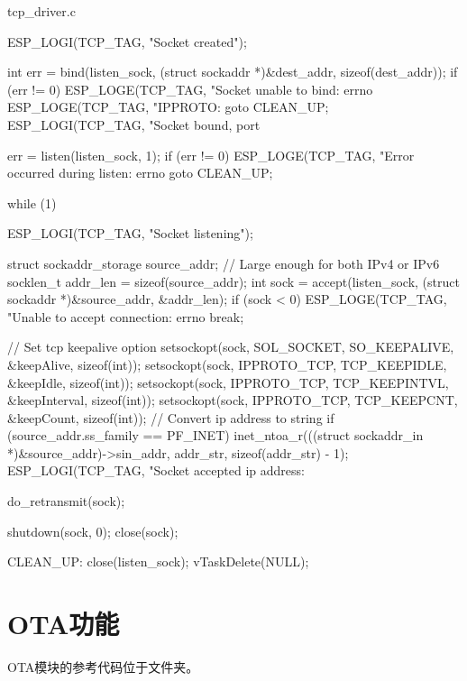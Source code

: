 \documentclass[lang=cn,newtx,10pt,scheme=chinese]{elegantbook}
\begin{document}
\begin{mycode}{tcp\_driver.c}
{    ESP_LOGI(TCP_TAG, "Socket created");

    int err = bind(listen_sock, (struct sockaddr *)&dest_addr, sizeof(dest_addr));
    if (err != 0)
    {
        ESP_LOGE(TCP_TAG, "Socket unable to bind: errno %
        ESP_LOGE(TCP_TAG, "IPPROTO: %
        goto CLEAN_UP;
    }
    ESP_LOGI(TCP_TAG, "Socket bound, port %

    err = listen(listen_sock, 1);
    if (err != 0)
    {
        ESP_LOGE(TCP_TAG, "Error occurred during listen: errno %
        goto CLEAN_UP;
    }

    while (1)
    {

        ESP_LOGI(TCP_TAG, "Socket listening");

        struct sockaddr_storage source_addr; // Large enough for both IPv4 or IPv6
        socklen_t addr_len = sizeof(source_addr);
        int sock = accept(listen_sock, (struct sockaddr *)&source_addr, &addr_len);
        if (sock < 0)
        {
            ESP_LOGE(TCP_TAG, "Unable to accept connection: errno %
            break;
        }

        // Set tcp keepalive option
        setsockopt(sock, SOL_SOCKET, SO_KEEPALIVE, &keepAlive, sizeof(int));
        setsockopt(sock, IPPROTO_TCP, TCP_KEEPIDLE, &keepIdle, sizeof(int));
        setsockopt(sock, IPPROTO_TCP, TCP_KEEPINTVL, &keepInterval, sizeof(int));
        setsockopt(sock, IPPROTO_TCP, TCP_KEEPCNT, &keepCount, sizeof(int));
        // Convert ip address to string
        if (source_addr.ss_family == PF_INET)
        {
            inet_ntoa_r(((struct sockaddr_in *)&source_addr)->sin_addr, addr_str, sizeof(addr_str) - 1);
        }
        ESP_LOGI(TCP_TAG, "Socket accepted ip address: %

        do_retransmit(sock);

        shutdown(sock, 0);
        close(sock);
    }

CLEAN_UP:
    close(listen_sock);
    vTaskDelete(NULL);
}
\end{mycode}

\chapter{OTA功能}

\begin{marker}
OTA模块的参考代码位于文件夹。
\end{marker}
\end{document}

